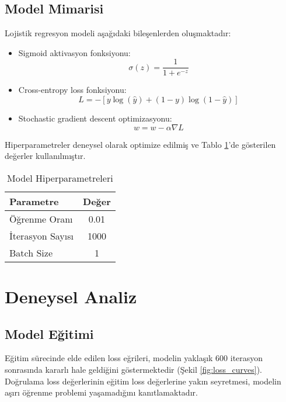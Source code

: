 \documentclass[conference]{IEEEtran}
\begin{document}
\subsection{Model Mimarisi}
Lojistik regresyon modeli aşağıdaki bileşenlerden oluşmaktadır:
\begin{itemize}
\item Sigmoid aktivasyon fonksiyonu: 
\begin{equation}
\sigma(z) = \frac{1}{1 + e^{-z}}
\end{equation}
\item Cross-entropy loss fonksiyonu:
\begin{equation}
L = -[y\log(\hat{y}) + (1-y)\log(1-\hat{y})]
\end{equation}
\item Stochastic gradient descent optimizasyonu:
\begin{equation}
w = w - \alpha\nabla L
\end{equation}
\end{itemize}

Hiperparametreler deneysel olarak optimize edilmiş ve Tablo
\ref{tab:hyperparameters}'de gösterilen değerler kullanılmıştır.

\begin{table}[!t]
\caption{Model Hiperparametreleri}
\label{tab:hyperparameters}
\centering
\begin{tabular}{|l|c|}
\hline
\textbf{Parametre} & \textbf{Değer} \\
\hline
Öğrenme Oranı & 0.01 \\
İterasyon Sayısı & 1000 \\
Batch Size & 1 \\
\hline
\end{tabular}
\end{table}

\section{Deneysel Analiz}

\subsection{Model Eğitimi}
Eğitim sürecinde elde edilen loss eğrileri, modelin yaklaşık 600 iterasyon
sonrasında kararlı hale geldiğini göstermektedir (Şekil \ref{fig:loss_curves}).
Doğrulama loss değerlerinin eğitim loss değerlerine yakın seyretmesi, modelin
aşırı öğrenme problemi yaşamadığını kanıtlamaktadır.
\end{document}
